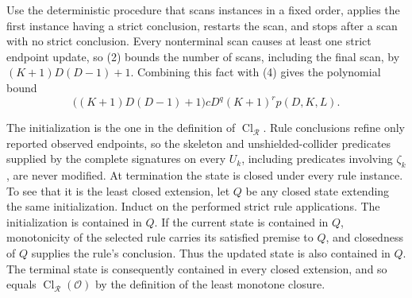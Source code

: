 Use the deterministic procedure that scans instances in a fixed order, applies the first instance having a strict conclusion, restarts the scan, and stops after a scan with no strict conclusion. Every nonterminal scan causes at least one strict endpoint update, so (2) bounds the number of scans, including the final scan, by \((K+1)D(D-1)+1\). Combining this fact with (4) gives the polynomial bound
\[
 \bigl((K+1)D(D-1)+1\bigr)cD^q(K+1)^r p(D,K,L).
\tag{5}
\]

The initialization is the one in the definition of \(\operatorname{Cl}_{\mathcal R}\). Rule conclusions refine only reported observed endpoints, so the skeleton and unshielded-collider predicates supplied by the complete signatures on every \(U_k\), including predicates involving \(\zeta_k\), are never modified. At termination the state is closed under every rule instance. To see that it is the least closed extension, let \(Q\) be any closed state extending the same initialization. Induct on the performed strict rule applications. The initialization is contained in \(Q\). If the current state is contained in \(Q\), monotonicity of the selected rule carries its satisfied premise to \(Q\), and closedness of \(Q\) supplies the rule's conclusion. Thus the updated state is also contained in \(Q\). The terminal state is consequently contained in every closed extension, and so equals \(\operatorname{Cl}_{\mathcal R}(\mathcal O)\) by the definition of the least monotone closure.

